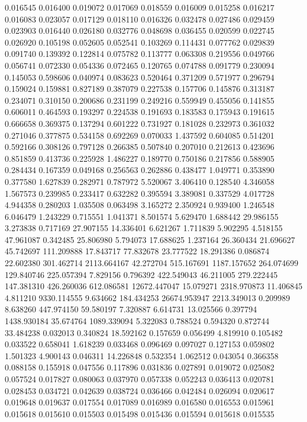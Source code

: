 0.016545
0.016400
0.019072
0.017069
0.018559
0.016009
0.015258
0.016217
0.016083
0.023057
0.017129
0.018110
0.016326
0.032478
0.027486
0.029459
0.023903
0.016440
0.026180
0.032776
0.048698
0.036455
0.020599
0.022745
0.026920
0.105198
0.052605
0.052541
0.103269
0.114431
0.077762
0.029839
0.091740
0.139392
0.122814
0.075782
0.113777
0.063308
0.219556
0.049766
0.056741
0.072330
0.054336
0.072465
0.120765
0.074788
0.091779
0.230094
0.145053
0.598606
0.040974
0.083623
0.520464
0.371209
0.571977
0.296794
0.159024
0.159881
0.827189
0.387079
0.227538
0.157706
0.145876
0.313187
0.234071
0.310150
0.200686
0.231199
0.249216
0.559949
0.455056
0.141855
0.606011
0.464593
0.193297
0.224538
0.191693
0.183583
0.175943
0.191615
0.666658
0.369375
0.137294
0.601222
0.731927
0.181028
0.232973
0.361032
0.271046
0.377875
0.534158
0.692269
0.070033
1.437592
0.604085
0.514201
0.592166
0.308126
0.797128
0.266385
0.507840
0.207010
0.212613
0.423696
0.851859
0.413736
0.225928
1.486227
0.189770
0.750186
0.217856
0.588905
0.284434
0.167359
0.049168
0.256563
0.262886
0.438477
1.049771
0.353890
0.377580
1.627839
0.282971
0.787972
5.520067
3.406410
0.128540
4.346058
1.567573
0.239985
0.233417
0.632282
0.395594
3.389081
0.337529
4.017728
4.944358
0.280203
1.035508
0.063498
3.165272
2.350924
0.939400
1.246548
6.046479
1.243229
0.715551
1.041371
8.501574
5.629470
1.688442
29.986155
3.273838
0.717169
27.907155
14.336401
6.621267
1.711839
5.902295
4.518155
47.961087
0.342485
25.806980
5.794073
17.688625
1.237164
26.360434
21.696627
45.742697
111.209888
17.843717
77.832678
23.777522
18.291386
0.086874
22.602380
301.462714
2113.664167
42.272704
515.167691
1187.157652
264.074699
129.840746
225.057394
7.829156
0.796392
422.549043
46.211005
279.222445
147.381310
426.260036
612.086581
12672.447047
15.079271
2318.970873
11.406845
4.811210
9330.114555
9.634662
184.434253
26674.953947
2213.349013
0.209989
8.638260
447.974150
59.580197
7.320887
6.614731
13.025566
0.397794
1438.930184
35.674764
1089.339094
5.322083
0.788524
0.594320
0.872744
33.484238
0.032013
0.340824
18.592162
0.157659
0.056499
4.819910
0.105482
0.033522
0.658041
1.618239
0.033468
0.096469
0.097027
0.127153
0.059802
1.501323
4.900143
0.046311
14.226848
0.532354
1.062512
0.043054
0.366358
0.088158
0.155918
0.047556
0.117896
0.031836
0.027891
0.019072
0.025082
0.057524
0.017827
0.080063
0.037970
0.057338
0.052243
0.036413
0.020781
0.028453
0.034721
0.042639
0.038724
0.036466
0.042484
0.026094
0.020617
0.019648
0.019637
0.017554
0.017089
0.016989
0.016580
0.016553
0.015961
0.015618
0.015610
0.015503
0.015498
0.015436
0.015594
0.015618
0.015535
